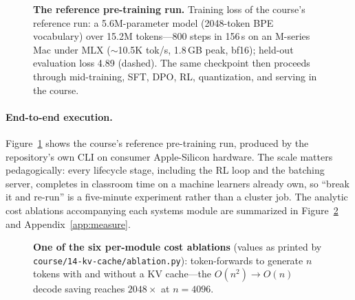 \begin{figure}[t]
  \centering
  
  \caption{\textbf{The reference pre-training run.} Training loss of the
  course's reference run: a 5.6M-parameter model (2048-token BPE vocabulary)
  over 15.2M tokens---800 steps in 156\,s on an M-series Mac under MLX
  ($\sim$10.5K tok/s, 1.8\,GB peak, bf16); held-out evaluation loss 4.89
  (dashed). The same checkpoint then proceeds through mid-training, SFT,
  DPO, RL, quantization, and serving in the course.}
  \label{fig:loss}
\end{figure}

\paragraph{End-to-end execution.} Figure~\ref{fig:loss} shows the course's
reference pre-training run, produced by the repository's own CLI on consumer
Apple-Silicon hardware. The scale matters pedagogically: every lifecycle
stage, including the RL loop and the batching server, completes in classroom
time on a machine learners already own, so ``break it and re-run'' is a
five-minute experiment rather than a cluster job. The analytic cost
ablations accompanying each systems module are summarized in
Figure~\ref{fig:ablations} and Appendix~\ref{app:measure}.

\begin{figure}[t]
  \centering
  
  \caption{\textbf{One of the six per-module cost ablations} (values as
  printed by \texttt{course/14-kv-cache/ablation.py}): token-forwards to
  generate $n$ tokens with and without a KV cache---the
  $O(n^2)\!\to\!O(n)$ decode saving reaches $2048\times$ at $n{=}4096$.}
  \label{fig:ablations}
\end{figure}

